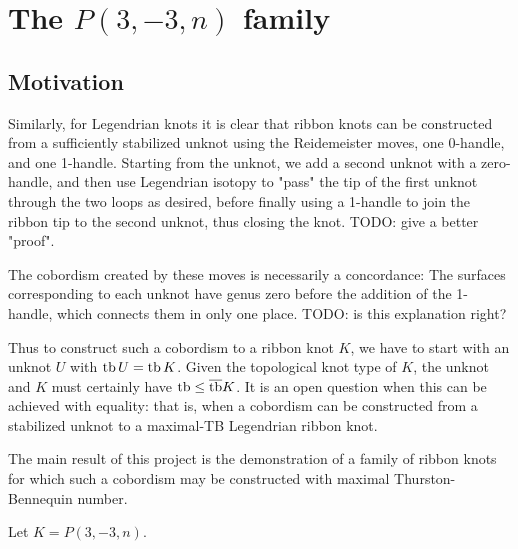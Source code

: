 \chapter{The \texorpdfstring{$P(3, -3, n)$}{P(3, -3, n)} family}
\section{Motivation}
Similarly, for Legendrian knots it is clear that ribbon knots can be constructed from a sufficiently stabilized unknot using the Reidemeister moves, one 0-handle, and one 1-handle. 
Starting from the unknot, we add a second unknot with a zero-handle, and then use Legendrian isotopy to "pass" the tip of the first unknot through the two loops as desired, before finally using a 1-handle to join the ribbon tip to the second unknot, thus closing the knot. 
TODO: give a better "proof".

The cobordism created by these moves is necessarily a concordance: The surfaces corresponding to each unknot have genus zero before the addition of the 1-handle, which connects them in only one place.
TODO: is this explanation right?

Thus to construct such a cobordism to a ribbon knot $K$, we have to start with an unknot $U$ with $\operatorname{tb} U = \operatorname{tb} K$. Given the topological knot type of $K$, the unknot and $K$ must certainly have $\operatorname{tb} \leq \overline{\operatorname{tb}} K$.
It is an open question when this can be achieved with equality: that is, when a cobordism can be constructed from a stabilized unknot to a maximal-TB Legendrian ribbon knot. 

The main result of this project is the demonstration of a family of ribbon knots for which such a cobordism may be constructed with maximal Thurston-Bennequin number.

\begin{theorem}
    Let $K = P(3, -3, n)$.
\end{theorem}
